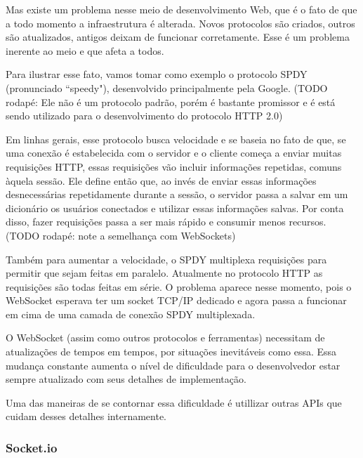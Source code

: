 \documentclass[a4paper,12pt]{article}
\begin{document}
Mas existe um problema nesse meio de desenvolvimento Web, que é o fato de que a todo momento a infraestrutura é alterada. Novos protocolos são criados, outros são atualizados, antigos deixam de funcionar corretamente. Esse é um problema inerente ao meio e que afeta a todos.

Para ilustrar esse fato, vamos tomar como exemplo o protocolo SPDY (pronunciado “speedy"), desenvolvido principalmente pela Google. (TODO rodapé: Ele não é um protocolo padrão, porém é bastante promissor e é está sendo utilizado para o desenvolvimento do protocolo HTTP 2.0)

Em linhas gerais, esse protocolo busca velocidade e se baseia no fato de que, se uma conexão é estabelecida com o servidor e o cliente começa a enviar muitas requisições HTTP, essas requisições vão incluir informações repetidas, comuns àquela sessão. Ele define então que, ao invés de enviar essas informações desnecessárias repetidamente durante a sessão, o servidor passa a salvar em um dicionário os usuários conectados e utilizar essas informações salvas. Por conta disso, fazer requisições passa a ser mais rápido e consumir menos recursos. (TODO rodapé: note a semelhança com WebSockets)

Também para aumentar a velocidade, o SPDY multiplexa requisições para permitir que sejam feitas em paralelo. Atualmente no protocolo HTTP as requisições são todas feitas em série. O problema aparece nesse momento, pois o WebSocket esperava ter um socket TCP/IP dedicado e agora passa a funcionar em cima de uma camada de conexão SPDY multiplexada.

O WebSocket (assim como outros protocolos e ferramentas) necessitam de  atualizações de tempos em tempos, por situações inevitáveis como essa. Essa mudança constante aumenta o nível de dificuldade para o desenvolvedor estar sempre atualizado com seus detalhes de implementação.

Uma das maneiras de se contornar essa dificuldade é utillizar outras APIs que cuidam desses detalhes internamente.


\subsubsection{Socket.io}


\end{document}

